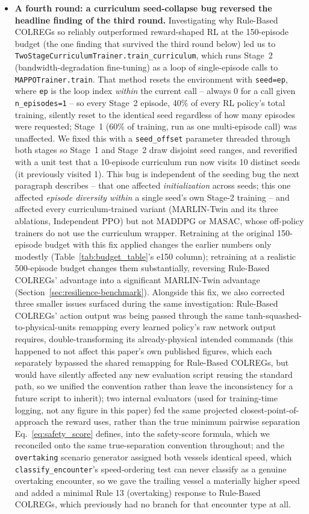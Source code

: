 \documentclass[journal,twocolumn,10pt]{IEEEtran}
\begin{document}
\begin{itemize}
    \item \textbf{A fourth round: a curriculum seed-collapse bug reversed the headline finding of the third round.} Investigating why Rule-Based COLREGs so reliably outperformed reward-shaped RL at the 150-episode budget (the one finding that survived the third round below) led us to \texttt{TwoStageCurriculumTrainer.train\_curriculum}, which runs Stage~2 (bandwidth-degradation fine-tuning) as a loop of single-episode calls to \texttt{MAPPOTrainer.train}. That method resets the environment with \texttt{seed=ep}, where \texttt{ep} is the loop index \emph{within} the current call -- always $0$ for a call given \texttt{n\_episodes=1} -- so every Stage~2 episode, 40\% of every RL policy's total training, silently reset to the identical seed regardless of how many episodes were requested; Stage~1 (60\% of training, run as one multi-episode call) was unaffected. We fixed this with a \texttt{seed\_offset} parameter threaded through both stages so Stage~1 and Stage~2 draw disjoint seed ranges, and reverified with a unit test that a 10-episode curriculum run now visits 10 distinct seeds (it previously visited 1). This bug is independent of the seeding bug the next paragraph describes -- that one affected \emph{initialization} across seeds; this one affected \emph{episode diversity within} a single seed's own Stage-2 training -- and affected every curriculum-trained variant (MARLIN-Twin and its three ablations, Independent PPO) but not MADDPG or MASAC, whose off-policy trainers do not use the curriculum wrapper. Retraining at the original 150-episode budget with this fix applied changes the earlier numbers only modestly (Table~\ref{tab:budget_table}'s e150 column); retraining at a realistic 500-episode budget changes them substantially, reversing Rule-Based COLREGs' advantage into a significant MARLIN-Twin advantage (Section~\ref{sec:resilience-benchmark}). Alongside this fix, we also corrected three smaller issues surfaced during the same investigation: Rule-Based COLREGs' action output was being passed through the same tanh-squashed-to-physical-units remapping every learned policy's raw network output requires, double-transforming its already-physical intended commands (this happened to not affect this paper's own published figures, which each separately bypassed the shared remapping for Rule-Based COLREGs, but would have silently affected any new evaluation script reusing the standard path, so we unified the convention rather than leave the inconsistency for a future script to inherit); two internal evaluators (used for training-time logging, not any figure in this paper) fed the same projected closest-point-of-approach the reward uses, rather than the true minimum pairwise separation Eq.~\ref{eq:safety_score} defines, into the safety-score formula, which we reconciled onto the same true-separation convention throughout; and the \texttt{overtaking} scenario generator assigned both vessels identical speed, which \texttt{classify\_encounter}'s speed-ordering test can never classify as a genuine overtaking encounter, so we gave the trailing vessel a materially higher speed and added a minimal Rule 13 (overtaking) response to Rule-Based COLREGs, which previously had no branch for that encounter type at all.

\end{itemize}
\end{document}
